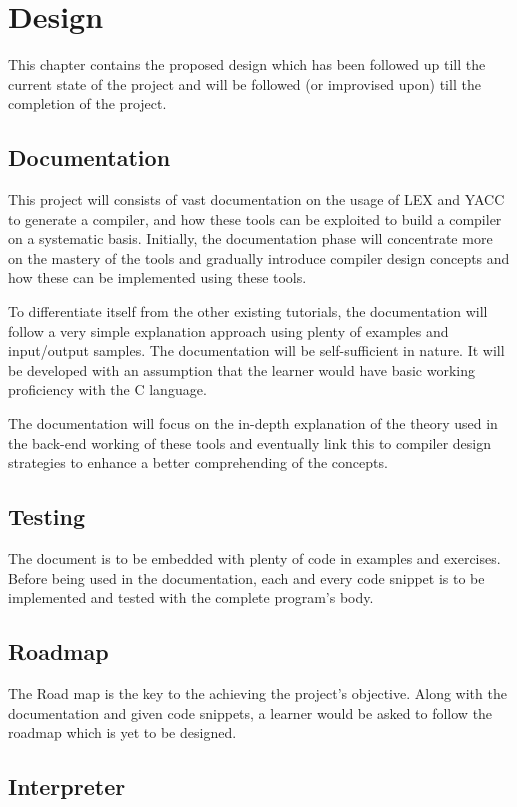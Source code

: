 \chapter{Design}

This chapter contains the proposed design which has been followed up till the current state of the project and will be followed (or improvised upon) till the completion of the project.
\section{Documentation}

This project will consists of vast documentation on the usage of LEX and YACC to generate a compiler, and how these tools can be exploited to build a compiler on a systematic basis. Initially, the documentation phase will concentrate more on the mastery of the tools and gradually introduce compiler design concepts and how these can be implemented using these tools.

To differentiate itself from the other existing tutorials, the documentation will follow a very simple explanation approach using plenty of examples and input/output samples. The documentation will be self-sufficient in nature. It will be developed with an assumption that the learner would have basic working proficiency with the C language.

The documentation will focus on the in-depth explanation of the theory used in the back-end working of these tools and eventually link this to compiler design strategies to enhance a better comprehending of the concepts.
\section{Testing}

The document is to be embedded with plenty of code in examples and exercises. Before being used in the documentation, each and every code snippet is to be implemented and tested with the complete program's body. 

\section{Roadmap}

The Road map is the key to the achieving the project's objective. Along with the documentation and given code snippets, a learner would be asked to follow the roadmap which is yet to be designed.
 
\section{Interpreter}

